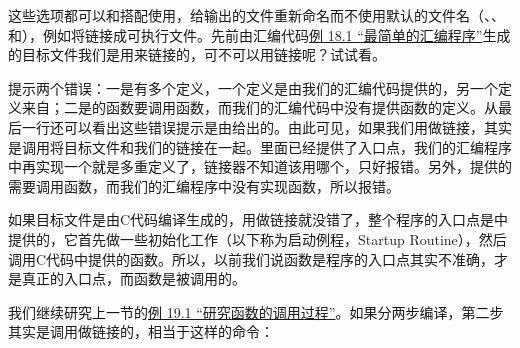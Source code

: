 

这些选项都可以和搭配使用，给输出的文件重新命名而不使用默认的文件名（、、和），例如将链接成可执行文件。先前由汇编代码\hyperlink{db.ch18s01.id2769136}{例 18.\BookSplit{}1 “最简单的汇编程序”}生成的目标文件我们是用来链接的，可不可以用链接呢？试试看。




提示两个错误：一是有多个定义，一个定义是由我们的汇编代码提供的，另一个定义来自；二是的函数要调用函数，而我们的汇编代码中没有提供函数的定义。从最后一行还可以看出这些错误提示是由给出的。由此可见，如果我们用做链接，其实是调用将目标文件和我们的链接在一起。里面已经提供了入口点，我们的汇编程序中再实现一个就是多重定义了，链接器不知道该用哪个，只好报错。另外，提供的需要调用函数，而我们的汇编程序中没有实现函数，所以报错。



如果目标文件是由C代码编译生成的，用做链接就没错了，整个程序的入口点是中提供的，它首先做一些初始化工作（以下称为启动例程，Startup Routine），然后调用C代码中提供的函数。所以，以前我们说函数是程序的入口点其实不准确，才是真正的入口点，而函数是被调用的。



我们继续研究上一节的\hyperlink{db.ch19s01.id2774388}{例 19.\BookSplit{}1 “研究函数的调用过程”}。如果分两步编译，第二步其实是调用做链接的，相当于这样的命令：


